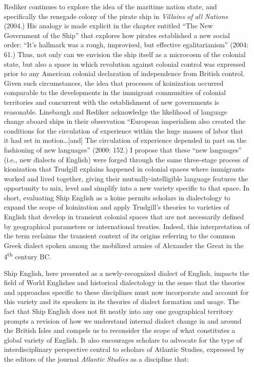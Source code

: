 Rediker continues to explore the idea of the maritime nation state, and specifically the renegade colony of the pirate ship in \textit{Villains} \textit{of} \textit{all} \textit{Nations} (2004.) His analogy is made explicit in the chapter entitled “The New Government of the Ship” that explores how pirates established a new social order: “It’s hallmark was a rough, improvised, but effective egalitarianism” (2004: 61.) Thus, not only can we envision the ship itself as a microcosm of the colonial state, but also a space in which revolution against colonial control was expressed prior to any American colonial declaration of independence from British control. Given such circumstances, the idea that processes of koinization occurred comparable to the developments in the immigrant communities of colonial territories and concurrent with the establishment of new governments is reasonable. Linebaugh and Rediker acknowledge the likelihood of language change aboard ships in their observation “European imperialism also created the conditions for the circulation of experience within the huge masses of labor that it had set in motion…[and] The circulation of experience depended in part on the fashioning of new languages” (2000: 152.) I propose that these “new languages” (i.e., new dialects of English) were forged through the same three-stage process of kionization that Trudgill explains happened in colonial spaces where immigrants worked and lived together, giving their mutually-intelligible language features the opportunity to mix, level and simplify into a new variety specific to that space. In short, evaluating Ship English as a koine permits scholars in dialectology to expand the scope of koinization and apply Trudgill’s theories to varieties of English that develop in transient colonial spaces that are not necessarily defined by geographical parameters or international treaties. Indeed, this interpretation of the term reclaims the transient context of its origins referring to the common Greek dialect spoken among the mobilized armies of Alexander the Great in the 4\textsuperscript{th} century BC. 

  Ship English, here presented as a newly-recognized dialect of English, impacts the field of World Englishes and historical dialectology in the sense that the theories and approaches specific to these disciplines must now incorporate and account for this variety and its speakers in its theories of dialect formation and usage. The fact that Ship English does not fit neatly into any one geographical territory prompts a revision of how we understand internal dialect change in and around the British Isles and compels us to reconsider the scope of what constitutes a global variety of English. It also encourages scholars to advocate for the type of interdisciplinary perspective central to scholars of Atlantic Studies, expressed by the editors of the journal \textit{Atlantic} \textit{Studies} as a discipline that:

